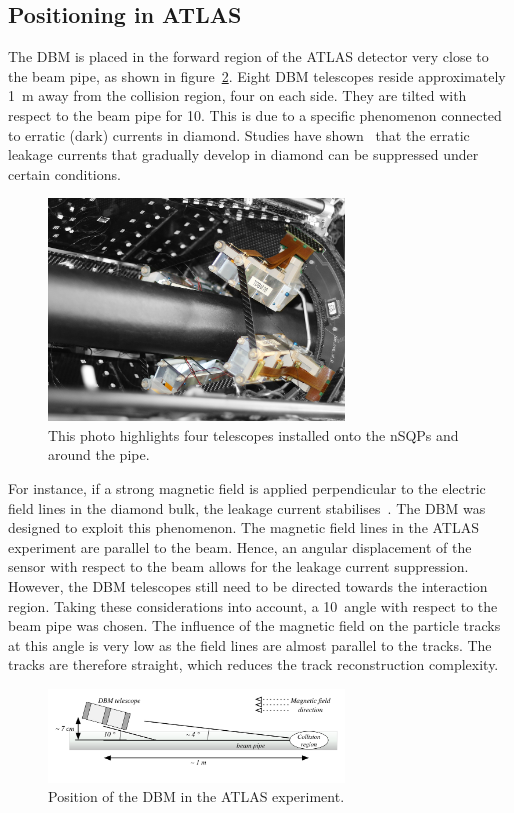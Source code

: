\subsection{Positioning in ATLAS}
The DBM is placed in the forward region of the ATLAS detector very close to the beam pipe, as shown in figure~\ref{fig:dbminatlas}. Eight DBM telescopes reside approximately 1~m away from the collision region, four on each side. They are tilted with respect to the beam pipe for 10\textdegree. This is due to a specific phenomenon connected to erratic (dark) currents in diamond. Studies have shown~\cite{} that the erratic leakage currents that gradually develop in diamond can be suppressed under certain conditions. 
\begin{figure}[!t]
\centering
\includegraphics[width=0.7\textwidth]{04_charge_monitoring/pics/DBM-installed-colour1}
\caption{This photo highlights four telescopes installed onto the nSQPs and around the pipe.}
\label{fig:dbminatlas}
\end{figure}
For instance, if a strong magnetic field is applied perpendicular to the electric field lines in the diamond bulk, the leakage current stabilises~\cite{}. The DBM was designed to exploit this phenomenon. The magnetic field lines in the ATLAS experiment are parallel to the beam. Hence, an angular displacement of the sensor with respect to the beam allows for the leakage current suppression. However, the DBM telescopes still need to be directed towards the interaction region. Taking these considerations into account, a 10\textdegree~angle with respect to the beam pipe was chosen. The influence of the magnetic field on the particle tracks at this angle is very low as the field lines are almost parallel to the tracks. The tracks are therefore straight, which reduces the track reconstruction complexity.

\begin{figure}[!t]
\centering
\includegraphics[width=0.7\textwidth]{../scripts/04_charge_monitoring/plots/DBM-positioning}
\caption{Position of the DBM in the ATLAS experiment.}
\label{fig:dbminatlas}
\end{figure}




